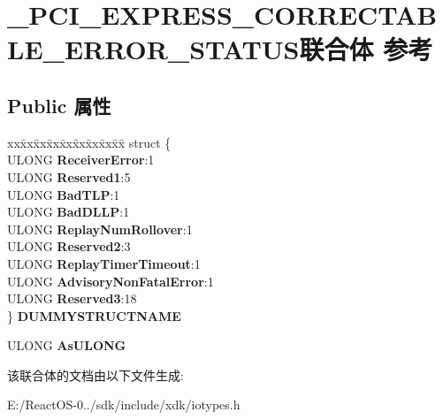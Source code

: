 \hypertarget{union___p_c_i___e_x_p_r_e_s_s___c_o_r_r_e_c_t_a_b_l_e___e_r_r_o_r___s_t_a_t_u_s}{}\section{\+\_\+\+P\+C\+I\+\_\+\+E\+X\+P\+R\+E\+S\+S\+\_\+\+C\+O\+R\+R\+E\+C\+T\+A\+B\+L\+E\+\_\+\+E\+R\+R\+O\+R\+\_\+\+S\+T\+A\+T\+U\+S联合体 参考}
\label{union___p_c_i___e_x_p_r_e_s_s___c_o_r_r_e_c_t_a_b_l_e___e_r_r_o_r___s_t_a_t_u_s}
\subsection*{Public 属性}
\begin{DoxyCompactItemize}
\item 
\mbox{\label{union___p_c_i___e_x_p_r_e_s_s___c_o_r_r_e_c_t_a_b_l_e___e_r_r_o_r___s_t_a_t_u_s_a3281d396e22c3442d7cc5905430e27cc}} 
\begin{tabbing}
xx\=xx\=xx\=xx\=xx\=xx\=xx\=xx\=xx\=\kill
struct \{\\
\>ULONG {\bfseries ReceiverError}:1\\
\>ULONG {\bfseries Reserved1}:5\\
\>ULONG {\bfseries BadTLP}:1\\
\>ULONG {\bfseries BadDLLP}:1\\
\>ULONG {\bfseries ReplayNumRollover}:1\\
\>ULONG {\bfseries Reserved2}:3\\
\>ULONG {\bfseries ReplayTimerTimeout}:1\\
\>ULONG {\bfseries AdvisoryNonFatalError}:1\\
\>ULONG {\bfseries Reserved3}:18\\
\} {\bfseries DUMMYSTRUCTNAME}\\

\end{tabbing}\item 
\mbox{\label{union___p_c_i___e_x_p_r_e_s_s___c_o_r_r_e_c_t_a_b_l_e___e_r_r_o_r___s_t_a_t_u_s_a733b242586f7fccbb539b919636f3aeb}} 
U\+L\+O\+NG {\bfseries As\+U\+L\+O\+NG}
\end{DoxyCompactItemize}


该联合体的文档由以下文件生成\+:\begin{DoxyCompactItemize}
\item 
E\+:/\+React\+O\+S-\/0../sdk/include/xdk/iotypes.\+h\end{DoxyCompactItemize}
